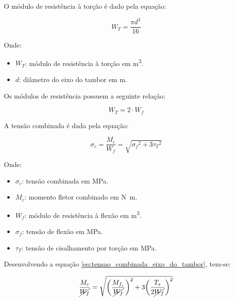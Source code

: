 \vspace{1em}

O módulo de resistência à torção é dado pela equação:

\begin{equation}
  W_T = \frac{\pi d^3}{16}
  \label{eq:modulo_de_resistencia_a_torcao_eixo_do_tambor}
\end{equation}

Onde:

\begin{itemize}
  \item $W_T$: módulo de resistência à torção em \si{\meter^3}.
  \item $d$: diâmetro do eixo do tambor em \si{\meter}.
\end{itemize}

\vspace{1em}

Os módulos de resistência possuem a seguinte relação:

\begin{equation}
  W_T = 2 \cdot W_f
  \label{eq:relacao_modulos_eixo}
\end{equation}

A tensão combinada é dada pela equação:

\begin{equation}
  \sigma_c = \frac{M_c}{W_f} = \sqrt{{\sigma_f}^2 + 3 {\tau_T}^2}
  \label{eq:tensao_combinada_eixo_do_tambor}
\end{equation}

Onde:

\begin{itemize}
  \item $\sigma_c$: tensão combinada em \si{\mega\pascal}.
  \item $M_c$: momento fletor combinado em \si{\newton\meter}.
  \item $W_f$: módulo de resistência à flexão em \si{\meter^3}.
  \item $\sigma_f$: tensão de flexão em \si{\mega\pascal}.
  \item $\tau_T$: tensão de cisalhamento por torção em \si{\mega\pascal}.
\end{itemize}

\vspace{1em}

Desenvolvendo a equação \eqref{eq:tensao_combinada_eixo_do_tambor}, tem-se:

\begin{equation*}
  \frac{M_c}{\cancel{W_f}} = \sqrt{{\left(\frac{M_{f_e}}{\cancel{W_f}}\right)}^2 + 3 {\left(\frac{T_s}{2 \cancel{W_f}}\right)}^2}
\end{equation*}

